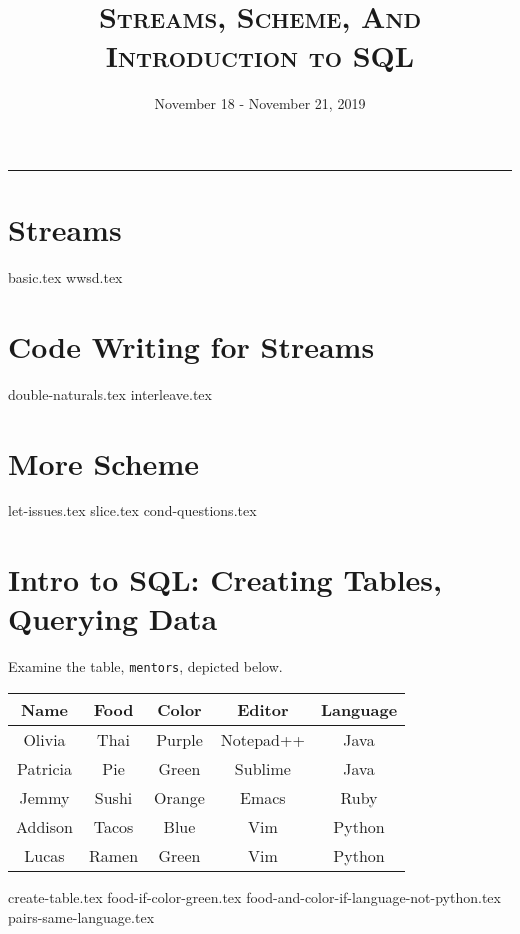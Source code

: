 \documentclass{exam}
\title{\textsc{Streams, Scheme, And Introduction to SQL}}
\date{November 18 - November 21, 2019}
\begin{document}
\maketitle\rule{\textwidth}{0.15em}
\fontsize{12}{15}\selectfont

\section{Streams}
\begin{questions}
{basic.tex}
\newpage
{wwsd.tex}
\end{questions}
\section{Code Writing for Streams}
\begin{questions}
{double-naturals.tex}
{interleave.tex}
\end{questions}

\section{More Scheme}
\begin{questions}
{let-issues.tex}
{slice.tex}
\newpage
{cond-questions.tex}
\end{questions}


\section{Intro to SQL: Creating Tables, Querying Data}
Examine the table, \texttt{mentors}, depicted below.

\begin{center}
\begin{tabular}{|c|c|c|c|c|}
 \hline
 \textbf{Name} & \textbf{Food} & \textbf{Color} & \textbf{Editor} & \textbf{Language} \\
 \hline
 Olivia & Thai & Purple & Notepad++ & Java \\
 \hline
 Patricia & Pie & Green & Sublime & Java \\
 \hline
 Jemmy & Sushi & Orange & Emacs & Ruby \\
 \hline
 Addison & Tacos & Blue & Vim & Python \\
 \hline
 Lucas & Ramen & Green & Vim & Python \\
 \hline
\end{tabular}
\end{center}

\begin{questions}
{create-table.tex}
\newpage
{food-if-color-green.tex}
{food-and-color-if-language-not-python.tex}
{pairs-same-language.tex}
\end{questions}
\end{document}
